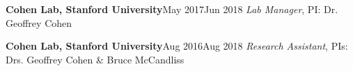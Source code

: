 {  
\entrybig
	{\textbf{Cohen Lab, Stanford University}}{May 2017\textendash Jun 2018}
	{\textit{Lab Manager}, PI: Dr. Geoffrey Cohen}{} %


\entrybig
	{\textbf{Cohen Lab, Stanford University}}{Aug 2016\textendash Aug 2018}
	{\textit{Research Assistant}, PIs: Drs. Geoffrey Cohen \& Bruce McCandliss}{} %



}
